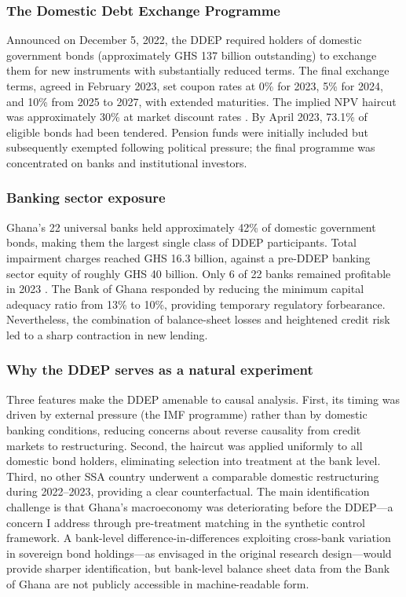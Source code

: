 \documentclass[12pt]{article}
\begin{document}
\subsubsection*{The Domestic Debt Exchange Programme} Announced on December 5, 2022, the DDEP required holders of domestic government bonds (approximately GHS 137 billion outstanding) to exchange them for new instruments with substantially reduced terms. The final exchange terms, agreed in February 2023, set coupon rates at 0\% for 2023, 5\% for 2024, and 10\% from 2025 to 2027, with extended maturities. The implied NPV haircut was approximately 30\% at market discount rates \citep{fitch2023ghana}. By April 2023, 73.1\% of eligible bonds had been tendered. Pension funds were initially included but subsequently exempted following political pressure; the final programme was concentrated on banks and institutional investors.

\subsubsection*{Banking sector exposure} Ghana's 22 universal banks held approximately 42\% of domestic government bonds, making them the largest single class of DDEP participants. Total impairment charges reached GHS 16.3 billion, against a pre-DDEP banking sector equity of roughly GHS 40 billion. Only 6 of 22 banks remained profitable in 2023 \citep{banco2023ddep}. The Bank of Ghana responded by reducing the minimum capital adequacy ratio from 13\% to 10\%, providing temporary regulatory forbearance. Nevertheless, the combination of balance-sheet losses and heightened credit risk led to a sharp contraction in new lending.

\subsubsection*{Why the DDEP serves as a natural experiment} Three features make the DDEP amenable to causal analysis. First, its timing was driven by external pressure (the IMF programme) rather than by domestic banking conditions, reducing concerns about reverse causality from credit markets to restructuring. Second, the haircut was applied uniformly to all domestic bond holders, eliminating selection into treatment at the bank level. Third, no other SSA country underwent a comparable domestic restructuring during 2022--2023, providing a clear counterfactual. The main identification challenge is that Ghana's macroeconomy was deteriorating before the DDEP---a concern I address through pre-treatment matching in the synthetic control framework. A bank-level difference-in-differences exploiting cross-bank variation in sovereign bond holdings---as envisaged in the original research design---would provide sharper identification, but bank-level balance sheet data from the Bank of Ghana are not publicly accessible in machine-readable form.
\end{document}
